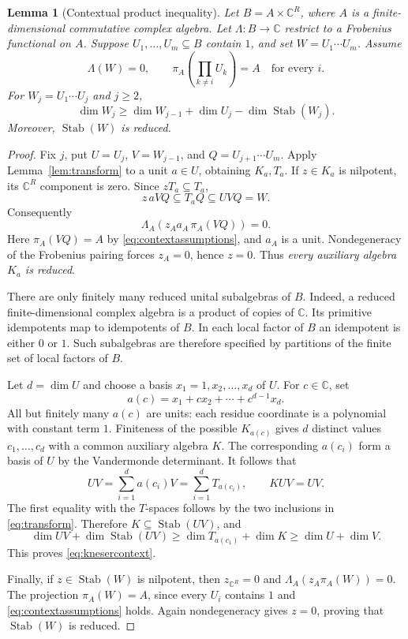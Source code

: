 \documentclass[11pt]{article}
\newtheorem{lemma}[theorem]{Lemma}
\theoremstyle{definition}
\theoremstyle{remark}
\newcommand{\C}{\mathbb C}
\newcommand{\Stab}{\operatorname{Stab}}
\begin{document}
\begin{lemma}[Contextual product inequality]\label{lem:context}
Let $B=A\times\C^R$, where $A$ is a finite-dimensional commutative complex
algebra. Let $\Lambda:B\to\C$ restrict to a Frobenius functional on $A$.
Suppose $U_1,\ldots,U_m\subseteq B$ contain $1$, and set $W=U_1\cdots U_m$.
Assume
\begin{equation}\label{eq:contextassumptions}
 \Lambda(W)=0,\qquad
 \pi_A\left(\prod_{k\ne i}U_k\right)=A
 \quad\text{for every }i.
\end{equation}
For $W_j=U_1\cdots U_j$ and $j\ge2$,
\begin{equation}\label{eq:knesercontext}
 \dim W_j\ge\dim W_{j-1}+\dim U_j-\dim\Stab(W_j).
\end{equation}
Moreover, $\Stab(W)$ is reduced.
\end{lemma}
\begin{proof}
Fix $j$, put $U=U_j$, $V=W_{j-1}$, and
$Q=U_{j+1}\cdots U_m$.
Apply Lemma~\ref{lem:transform} to a unit $a\in U$, obtaining $K_a,T_a$.
If $z\in K_a$ is nilpotent, its $\C^R$ component is zero. Since
$zT_a\subseteq T_a$,
\[
 z\,aVQ\subseteq T_aQ\subseteq UVQ=W.
\]
Consequently
\[
 \Lambda_A(z_Aa_A\,\pi_A(VQ))=0.
\]
Here $\pi_A(VQ)=A$ by \eqref{eq:contextassumptions}, and $a_A$ is a unit.
Nondegeneracy of the Frobenius pairing forces $z_A=0$, hence $z=0$.
Thus \emph{every auxiliary algebra $K_a$ is reduced}.

There are only finitely many reduced unital subalgebras of $B$.
Indeed, a reduced finite-dimensional complex algebra is a product of copies
of $\C$. Its primitive idempotents map to idempotents of $B$.
In each local factor of $B$ an idempotent is either $0$ or $1$.
Such subalgebras are therefore specified by partitions of the finite set of
local factors of $B$.

Let $d=\dim U$ and choose a basis $x_1=1,x_2,\ldots,x_d$ of $U$.
For $c\in\C$, set
\[
 a(c)=x_1+cx_2+\cdots+c^{d-1}x_d.
\]
All but finitely many $a(c)$ are units: each residue coordinate is a polynomial
with constant term $1$. Finiteness of the possible $K_{a(c)}$ gives $d$ distinct
values $c_1,\ldots,c_d$ with a common auxiliary algebra $K$.
The corresponding $a(c_i)$ form a basis of $U$ by the Vandermonde determinant.
It follows that
\[
 UV=\sum_{i=1}^d a(c_i)V=\sum_{i=1}^dT_{a(c_i)},\qquad KUV=UV.
\]
The first equality with the $T$-spaces follows by the two inclusions in
\eqref{eq:transform}. Therefore $K\subseteq\Stab(UV)$, and
\[
 \dim UV+\dim\Stab(UV)
 \ge\dim T_{a(c_1)}+\dim K\ge\dim U+\dim V.
\]
This proves \eqref{eq:knesercontext}.

Finally, if $z\in\Stab(W)$ is nilpotent, then $z_{\C^R}=0$ and
$\Lambda_A(z_A\pi_A(W))=0$. The projection $\pi_A(W)=A$, since every $U_i$
contains $1$ and \eqref{eq:contextassumptions} holds.
Again nondegeneracy gives $z=0$, proving that $\Stab(W)$ is reduced.
\end{proof}
\end{document}
